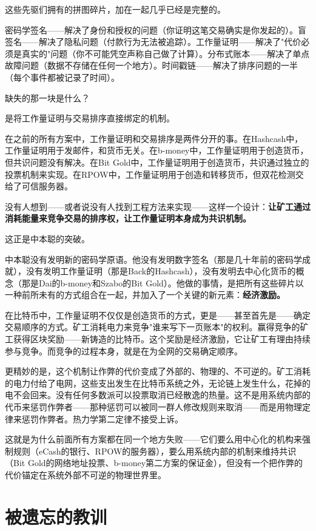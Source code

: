 \documentclass[a4paper,12pt,openany]{ctexbook}
\begin{document}
这些先驱们拥有的拼图碎片，加在一起几乎已经是完整的。

密码学签名——解决了身份和授权的问题（你证明这笔交易确实是你发起的）。盲签名——解决了隐私问题（付款行为无法被追踪）。工作量证明——解决了"代价必须是真实的"问题（你不可能凭空声称自己做了计算）。分布式账本——解决了单点故障问题（数据不存储在任何一个地方）。时间戳链——解决了排序问题的一半（每个事件都被记录了时间）。

缺失的那一块是什么？

是将工作量证明与交易排序直接绑定的机制。

在之前的所有方案中，工作量证明和交易排序是两件分开的事。在Hashcash中，工作量证明用于发邮件，和货币无关。在b-money中，工作量证明用于创造货币，但共识问题没有解决。在Bit Gold中，工作量证明用于创造货币，共识通过独立的投票机制来实现。在RPOW中，工作量证明用于创造和转移货币，但双花检测交给了可信服务器。

没有人想到——或者说没有人找到工程方法来实现——这样一个设计：\textbf{让矿工通过消耗能量来竞争交易的排序权，让工作量证明本身成为共识机制。}

这正是中本聪的突破。

中本聪没有发明新的密码学原语。他没有发明数字签名（那是几十年前的密码学成就），没有发明工作量证明（那是Back的Hashcash），没有发明去中心化货币的概念（那是Dai的b-money和Szabo的Bit Gold）。他做的事情，是把所有这些碎片以一种前所未有的方式组合在一起，并加入了一个关键的新元素：\textbf{经济激励。}

在比特币中，工作量证明不仅仅是创造货币的方式，更是——甚至首先是——确定交易顺序的方式。矿工消耗电力来竞争"谁来写下一页账本"的权利。赢得竞争的矿工获得区块奖励——新铸造的比特币。这个奖励是经济激励，它让矿工有理由持续参与竞争。而竞争的过程本身，就是在为全网的交易确定顺序。

更精妙的是，这个机制让作弊的代价变成了外部的、物理的、不可逆的。矿工消耗的电力付给了电网，这些支出发生在比特币系统之外，无论链上发生什么，花掉的电不会回来。没有任何多数派可以投票取消已经散逸的热量。这不是用系统内部的代币来惩罚作弊者——那种惩罚可以被同一群人修改规则来取消——而是用物理定律来惩罚作弊者。热力学第二定律不接受上诉。

这就是为什么前面所有方案都在同一个地方失败——它们要么用中心化的机构来强制规则（eCash的银行、RPOW的服务器），要么用系统内部的机制来维持共识（Bit Gold的网络地址投票、b-money第二方案的保证金），但没有一个把作弊的代价锚定在系统外部不可逆的物理世界里。


\section*{被遗忘的教训}
\end{document}
